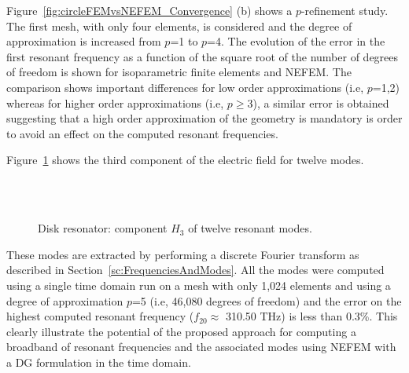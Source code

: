Figure~\ref{fig:circleFEMvsNEFEM_Convergence} (b) shows a $p$-refinement study. The first mesh, with only four elements, is considered and the degree of approximation is increased from $p$=1 to $p$=4. The evolution of the error in the first resonant frequency as a function of the square root of the number of degrees of freedom is shown for isoparametric finite elements and NEFEM. The comparison shows important differences for low order approximations (i.e, $p$=1,2) whereas for higher order approximations (i.e, $p \geq$3), a similar error is obtained suggesting that a high order approximation of the geometry is mandatory is order to avoid an effect on the computed resonant frequencies. 

Figure~\ref{fig:circle2DfreeSpace_modes} shows the third component of the electric field for twelve modes. 
\begin{figure}[!ht]
\centering
{}
 \\
%
 \\
%
\caption{Disk resonator: component $H_3$ of twelve resonant modes.}
\label{fig:circle2DfreeSpace_modes}
\end{figure}
These modes are extracted by performing a discrete Fourier transform as described in Section~\ref{sc:FrequenciesAndModes}. All the modes were computed using a single time domain run on a mesh with 
only 1,024 elements and using a degree of approximation $p$=5 (i.e, 46,080 degrees of freedom) and the error on the highest computed resonant frequency ($f_{20} \approx$ 310.50 THz) is less than 0.3\%. This clearly illustrate the potential of the proposed approach for computing a broadband of resonant frequencies and the associated modes using NEFEM with a DG formulation in the time domain.

